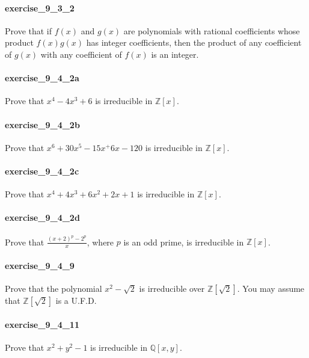\documentclass{article}
\begin{document}
\paragraph{exercise\_9\_3\_2} Prove that if $f(x)$ and $g(x)$ are polynomials with rational coefficients whose product $f(x) g(x)$ has integer coefficients, then the product of any coefficient of $g(x)$ with any coefficient of $f(x)$ is an integer.

\paragraph{exercise\_9\_4\_2a} Prove that $x^4-4x^3+6$ is irreducible in $\mathbb{Z}[x]$.

\paragraph{exercise\_9\_4\_2b} Prove that $x^6+30x^5-15x^+6x-120$ is irreducible in $\mathbb{Z}[x]$.

\paragraph{exercise\_9\_4\_2c} Prove that $x^4+4x^3+6x^2+2x+1$ is irreducible in $\mathbb{Z}[x]$.

\paragraph{exercise\_9\_4\_2d} Prove that $\frac{(x+2)^p-2^p}{x}$, where $p$ is an odd prime, is irreducible in $\mathbb{Z}[x]$.

\paragraph{exercise\_9\_4\_9} Prove that the polynomial $x^{2}-\sqrt{2}$ is irreducible over $\mathbb{Z}[\sqrt{2}]$. You may assume that $\mathbb{Z}[\sqrt{2}]$ is a U.F.D.

\paragraph{exercise\_9\_4\_11} Prove that $x^2+y^2-1$ is irreducible in $\mathbb{Q}[x,y]$.
\end{document}
